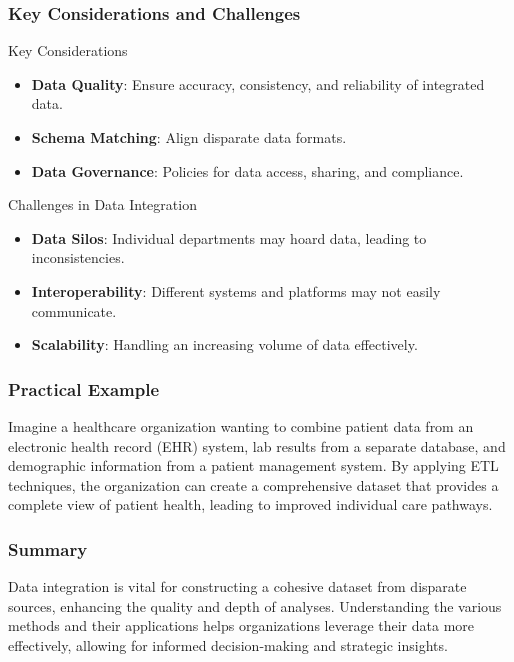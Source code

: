 \documentclass[aspectratio=169]{beamer}
\begin{document}
\begin{frame}[fragile]
    \frametitle{Key Considerations and Challenges}
    \begin{block}{Key Considerations}
        \begin{itemize}
            \item \textbf{Data Quality}: Ensure accuracy, consistency, and reliability of integrated data.
            \item \textbf{Schema Matching}: Align disparate data formats.
            \item \textbf{Data Governance}: Policies for data access, sharing, and compliance.
        \end{itemize}
    \end{block}
    
    \begin{block}{Challenges in Data Integration}
        \begin{itemize}
            \item \textbf{Data Silos}: Individual departments may hoard data, leading to inconsistencies.
            \item \textbf{Interoperability}: Different systems and platforms may not easily communicate.
            \item \textbf{Scalability}: Handling an increasing volume of data effectively.
        \end{itemize}
    \end{block}
\end{frame}

\begin{frame}[fragile]
    \frametitle{Practical Example}
    Imagine a healthcare organization wanting to combine patient data from an electronic health record (EHR) system, lab results from a separate database, and demographic information from a patient management system. By applying ETL techniques, the organization can create a comprehensive dataset that provides a complete view of patient health, leading to improved individual care pathways.
\end{frame}

\begin{frame}[fragile]
    \frametitle{Summary}
    Data integration is vital for constructing a cohesive dataset from disparate sources, enhancing the quality and depth of analyses. Understanding the various methods and their applications helps organizations leverage their data more effectively, allowing for informed decision-making and strategic insights.
\end{frame}
\end{document}
